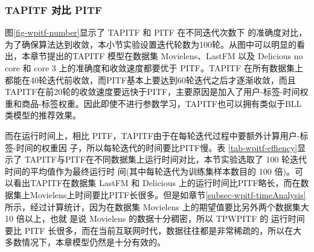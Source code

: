 \subsubsection{TAPITF 对比 PITF}

图\ref{fig-wpitf-number}显示了 TAPITF 和 PITF 在不同迭代次数下
的准确度对比，为了确保算法达到收敛，本小节实验设置迭代轮数为100轮。从图中可以明显的看出，本章节提出的TAPITF 模型在数据集 Movielens、LastFM 以及 Delicious no core 和 core 3 上的准确度和收敛速度都要优于 PITF。TAPITF 在所有数据集上都能在40轮迭代前收敛，而PITF基本上要达到60轮迭代之后才逐渐收敛，而且 TAPITF在前20轮的收敛速度要远快于PITF，主要原因是加入了用户-标签-时间权重和商品-标签权重。因此即使不进行参数学习，TAPITF也可以拥有类似于BLL类模型的推荐效果。

而在运行时间上，相比 PITF，TAPITF由于在每轮迭代过程中要额外计算用户-标签-时间的权重因 子，所以每轮迭代的时间要比PITF慢。表 \ref{tab-wpitf-effiency}显示了 TAPITF与PITF在不同数据集上运行时间对比，本节实验选取了 100 轮迭代时间的平均值作为最终运行时 间(其中每轮迭代为训练集样本数目的 100 倍)。可以看出TAPITF在数据集 LastFM 和 Delicious 上的运行时间比PITF略长，而在数据集上Movielens上时间要比PITF长很多。但是如章节\ref{subsec-wpitf-timeAnalysis}所示，经过计算统计，因为在数据集 Movielens 上的期望值要比另外两个数据集大 10 倍以上，也就 是说 Movielens 的数据十分稠密，所以 TPWPITF 的 运行时间要比 PITF 长很多，而在当前互联网时代，数据往往都是非常稀疏的，所以在大多数情况下，本章模型仍然是十分有效的。

